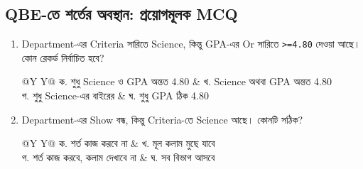 \subsection{QBE-তে শর্তের অবস্থান: প্রয়োগমূলক MCQ}
\begin{enumerate}
\item \begin{minipage}[t]{\linewidth}Department-এর Criteria সারিতে Science, কিন্তু GPA-এর Or সারিতে \texttt{>=4.80} দেওয়া আছে। কোন রেকর্ড নির্বাচিত হবে?
\begin{tabularx}{\linewidth}{@{}Y Y@{}}
ক. শুধু Science ও GPA অন্তত 4.80 & খ. Science অথবা GPA অন্তত 4.80\\
গ. শুধু Science-এর বাইরের & ঘ. শুধু GPA ঠিক 4.80\\
\end{tabularx}
\end{minipage}
\item \begin{minipage}[t]{\linewidth}Department-এর Show বন্ধ, কিন্তু Criteria-তে Science আছে। কোনটি সঠিক?
\begin{tabularx}{\linewidth}{@{}Y Y@{}}
ক. শর্ত কাজ করবে না & খ. মূল কলাম মুছে যাবে\\
গ. শর্ত কাজ করবে, কলাম দেখাবে না & ঘ. সব বিভাগ আসবে\\
\end{tabularx}
\end{minipage}
\end{enumerate}
